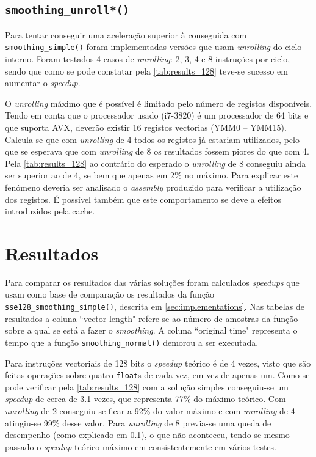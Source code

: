 \documentclass[a4paper]{article}
\begin{document}
	
	\subsection{\texttt{smoothing\_unroll*()}}
	\label{subsec:implementation_unrolling}
	
	Para tentar conseguir uma aceleração superior à conseguida com \texttt{smoothing\_simple()} foram implementadas versões que usam \textit{unrolling} do ciclo interno. Foram testados 4 casos de \textit{unrolling}: 2, 3, 4 e 8 instruções por ciclo, sendo que como se pode constatar pela \autoref{tab:results_128} teve-se sucesso em aumentar o \textit{speedup}.
	
	O \textit{unrolling} máximo que é possível é limitado pelo número de registos disponíveis. Tendo em conta que o processador usado (i7-3820) é um processador de 64 bits e que suporta AVX, deverão existir 16 registos vectorias (YMM0 -- YMM15). Calcula-se que com \textit{unrolling} de 4 todos os registos já estariam utilizados, pelo que se esperava que com \textit{unrolling} de 8 os resultados fossem piores do que com 4. Pela \autoref{tab:results_128} ao contrário do esperado o \textit{unrolling} de 8 conseguiu ainda ser superior ao de 4, se bem que apenas em 2\% no máximo. Para explicar este fenómeno deveria ser analisado o \textit{assembly} produzido para verificar a utilização dos registos. É possível também que este comportamento se deve a efeitos introduzidos pela cache.
	
	
	\section{Resultados} 
	
	Para comparar os resultados das várias soluções foram calculados \textit{speedups} que usam como base de comparação os resultados da função \texttt{sse128\_smoothing\_simple()}, descrita em \ref{sec:implementations}. Nas tabelas de resultados a coluna ``vector length" refere-se ao número de amostras da função sobre a qual se está a fazer o \textit{smoothing}. A coluna ``original time" representa o tempo que a função \texttt{smoothing\_normal()} demorou a ser executada.
	
	Para instruções vectoriais de 128 bits o \textit{speedup} teórico é de 4 vezes, visto que são feitas operações sobre quatro \texttt{float}s de cada vez, em vez de apenas um. Como se pode verificar pela \autoref{tab:results_128} com a solução simples conseguiu-se um \textit{speedup} de cerca de 3.1 vezes, que representa 77\% do máximo teórico. Com \textit{unrolling} de 2 conseguiu-se ficar a 92\% do valor máximo e com \textit{unrolling} de 4 atingiu-se 99\% desse valor. Para \textit{unrolling} de 8 previa-se uma queda de desempenho (como explicado em \ref{subsec:implementation_unrolling}), o que não aconteceu, tendo-se mesmo passado o \textit{speedup} teórico máximo em consistentemente em vários testes.
	
\end{document}
